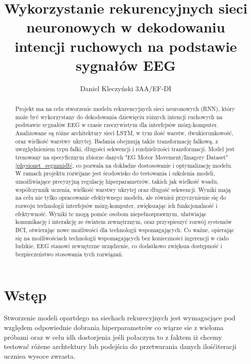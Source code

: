 \documentclass[12pt,twoside]{article}
\author{Daniel Kleczyński 3AA/EF-DI}
\title{Wykorzystanie rekurencyjnych sieci neuronowych w
dekodowaniu intencji ruchowych na podstawie sygnałów EEG}
\begin{document}
\maketitle

\blankpage

\tableofcontents

\clearpage
\blankpage


\begin{abstract}

	Projekt ma na celu stworzenie modelu rekurencyjnych sieci neuronowych (RNN), który może być wykorzystany do dekodowania dziewięciu różnych intencji ruchowych na podstawie sygnałów EEG w czasie rzeczywistym dla interfejsów mózg-komputer. Analizowane są różne architektury sieci LSTM, w tym ilość warstw, dwukierunkowość, oraz wielkość warstwy ukrytej. Badania obejmują także transformację falkową, z uwzględnieniem typu falki, długości sekwencji i rozdzielczości transformacji. Model jest trenowany na specyficznym zbiorze danych "EG Motor Movement/Imagery Dataset" \ref{physionet_eegmmidb}, co pozwala na dokładne dostosowanie i optymalizację modelu. W ramach projektu rozwijane jest środowisko do testowania i szkolenia modeli, umożliwiające precyzyjną regulację hiperparametrów, takich jak wielkość wsadu, współczynnik uczenia, wielkość warstwy ukrytej oraz długość sekwencji. Wyniki mają na celu nie tylko opracowanie efektywnego modelu,  ale również przyczynienie się do rozwoju technologii interfejsów mózg-komputer, zwiększając ich funkcjonalność i efektywność. Wyniki te mogą pomóc osobom niepełnosprawnym, ułatwiając komunikację i interakcję ze światem zewnętrznym, oraz przyspieszyć rozwój systemów BCI, otwierając nowe możliwości dla technologii wspomagających. Co ważne, opierając się na możliwościach technologii wspomagających bez konieczności ingerencji w ciało ludzkie, EEG stanowi zewnętrzne urządzenie, co dodatkowo zwiększa dostępność i bezpieczeństwo stosowania tych rozwiązań.
\end{abstract}

\clearpage
\section{Wstęp}
Stworzenie modeli opartdego na siechach rekurecyjnych jest wymagacjące pod względem odpowiednie dobrania hiperparametrów co wiąrze sie z wieloma próbami oraz w celu idh dostorjenia jeśli połaczym to z faktem iż chcemy testować różene archtektury lub podejścia do przetwarania danych ilośćiteracji uczniea wysoce zwrasta.
\end{document}
